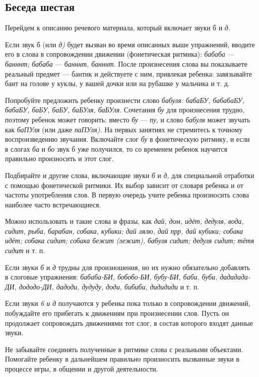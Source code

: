 \documentclass[a5paper]{book}
\renewcommand{\emph}[1]{\textit{#1}}
\begin{document}
\subsection*{Беседа шестая}

Перейдем к описанию речевого материала, который включает звуки б и
\emph{д.}

Если звук б (или \emph{д)} будет вызван во время описанных выше
упражнений, вводите его в слова в сопровождении движении (фонетическая
ритмика): \emph{бабаба} --- \emph{банннт; бабаба} --- \emph{банннт,
банннт.} После произнесения слова вы показываете реальный предмет ---
бантик и действуете с ним, привлекая ребенка: завязывайте бант на голове
у куклы, у вашей дочки или на рубашке у мальчика и т. д.

Попробуйте предложить ребенку произнести слово \emph{бабуля: бабаБУ,
бабабаБУ, бабаБУ, баБУ, баБУ, баБУля, баБУля.} Сочетания \emph{бу} для
произнесения трудно, поэтому ребенок может говорить: вместо \emph{бу}
--- \emph{пу}, и слово \emph{бабуля} может звучать как \emph{баПУля}
(или даже \emph{паПУля).} На первых занятиях не стремитесь к точному
воспроизведению звучания. Включайте слог \emph{бу} в фонетическую
ритмику, и если в слогах \emph{ба} и \emph{бо} звук б уже получился, то
со временем ребенок научится правильно произносить и этот слог.

Подбирайте и другие слова, включающие звуки \emph{б} и \emph{д,} для
специальной отработки с помощью фонетической ритмики. Их выбор зависит
от словаря ребенка и от частоты употребления слов. В первую очередь
учите ребенка произносить слова наиболее часто встречающиеся.

Можно использовать и такие слова и фразы, как \emph{дай, дом, идёт,
дедуля, вода, сидит, рыба, барабан, собака, кубики; дай лялю, дай прр,
дай кубики; собака идёт; собака сидит; собака бежит (лежит), бабуля
сидит; дедуля сидит; тётя сидит} и т. п.

Если звуки \emph{б} и \emph{д} трудны для произношения, но их нужно
обязательно добавлять в слоговые упражнения: \emph{бабаба-БИ, бобобо-БИ,
бубу-БИ, баби, буби, дададада-ДИ, дододо-ДИ, дадоди, дудуду, доди,
бибиби, дидидиди} и т. п.

Если звуки \emph{6 и д} получаются у ребенка пока только в сопровождении
движений, побуждайте его прибегать к движениям при произнесении слов.
Пусть он продолжает сопровождать движениями тот слог, в состав которого
входят данные звуки.

Не забывайте соединять полученные в ритмике слова с реальными объектами.
Помогайте ребенку в дальнейшем правильно произносить вызванные звуки в
процессе игры, в общении и другой деятельности.
\end{document}
